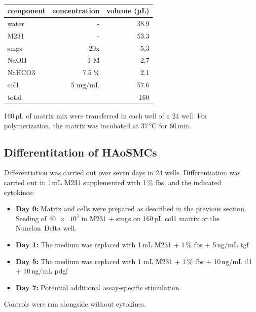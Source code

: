     \begin{table}[h]
    \capstart
	\centering
	\begin{minipage}{\captionwidth}
	   	\caption[Col I matrix]{}
	   	\label{tab:matrix}
	\end{minipage}
    \begin{tabular}{|l|r|r|}
        \hline
        component & concentration & volume (µL) \\ \hline
        \ac{water}       & -             & 38.9        \\
        \ac{M231}      & -             & 53.3        \\
        \ac{smgs}      & 20x           & 5,3         \\
        NaOH      & 1 M           & 2,7         \\
        NaHCO3    & 7.5 \%        & 2.1         \\
        \ac{col1}    & 5 mg/mL       & 57.6        \\ \hline
        total     & -             & 160         \\ \hline
    \end{tabular}
    \end{table}

    160\,µL of matrix mix were transferred in each well of a \ac{24 well}. For polymerization, the matrix was incubated at 37\,°C for 60\,min.

    \subsection{Differentitation of HAoSMCs}
    \label{subsec:differentiation}
    Differentiation was carried out over seven days in \acp{24 well}. Differentiation was carried out in 1\,mL M231 supplemented with 1\,\% \ac{fbs}, and the indicated cytokines:
    \begin{itemize}
        \item \textbf{Day 0:} Matrix and cells were prepared as described in the previous section. Seeding of $\num{40e3}$ in \ac{M231} + \ac{smgs} on 160\,µL \ac{col1} matrix or the Nunclon\texttrademark~Delta well.
        \item \textbf{Day 1:} The medium was replaced with 1\,mL M231 + 1\,\% \ac{fbs} + 5\,ng/mL \ac{tgf}
        \item \textbf{Day 5:} The medium was replaced with 1 mL M231 + 1\,\% \ac{fbs} + 10\,ng/mL \ac{il1} + 10\,ng/mL \ac{pdgf}
        \item \textbf{Day 7:} Potential additional assay-specific stimulation.
    \end{itemize}
    Controls were run alongside without cytokines.

